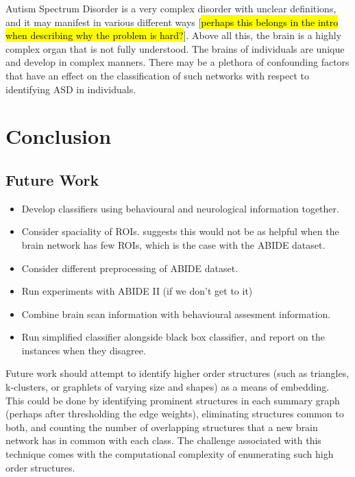 \documentclass[sigconf]{acmart}
\begin{document}
Autism Spectrum Disorder is a very complex disorder with unclear definitions, and it may manifest in various different ways [\hl{perhaps this belongs in the intro when describing why the problem is hard?}].
Above all this, the brain is a highly complex organ that is not fully understood.
The brains of individuals are unique and develop in complex manners.
There may be a plethora of confounding factors that have an effect on the classification of such networks with respect to identifying ASD in individuals.







\section{Conclusion}



\subsection{Future Work}
\begin{itemize}
    \item Develop classifiers using behavioural and neurological information together.
    \item Consider spaciality of ROIs. \cite{relion2019} suggests this would not be as helpful when the brain network has few ROIs, which is the case with the ABIDE dataset.
    \item Consider different preprocessing of ABIDE dataset.
    \item Run experiments with ABIDE II (if we don't get to it)
    \item Combine brain scan information with behavioural assesment information.
    \item Run simplified classifier alongside black box classifier, and report on the instances when they disagree.
\end{itemize}

Future work should attempt to identify higher order structures (such as triangles, k-clusters, or graphlets of varying size and shapes) as a means of embedding.
This could be done by identifying prominent structures in each summary graph (perhaps after thresholding the edge weights), eliminating structures common to both, and counting the number of overlapping structures that a new brain network has in common with each class.
The challenge associated with this technique comes with the computational complexity of enumerating such high order structures.
\end{document}
